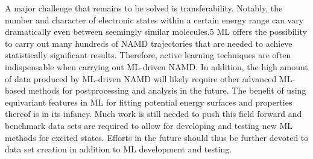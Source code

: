 \documentclass[9pt,bestpractices]{livecoms}
\begin{document}
A major challenge that remains to be solved is transferability. Notably, the number and character of electronic states within a certain energy range can vary dramatically even between seemingly similar molecules.5 ML offers the possibility to carry out many hundreds of NAMD trajectories that are needed to achieve statistically significant results. Therefore, active learning techniques are often indispensable when carrying out ML-driven NAMD. In addition, the high amount of data produced by ML-driven NAMD will likely require other advanced ML-based methods for postprocessing and analysis in the future. The benefit of using equivariant features in ML for fitting potential energy surfaces and properties thereof is in its infancy. Much work is still needed to push this field forward and benchmark data sets are required to allow for developing and testing new ML methods for excited states. Efforts in the future should thus be further devoted to data set creation in addition to ML development and testing. 

\clearpage




\end{document}
